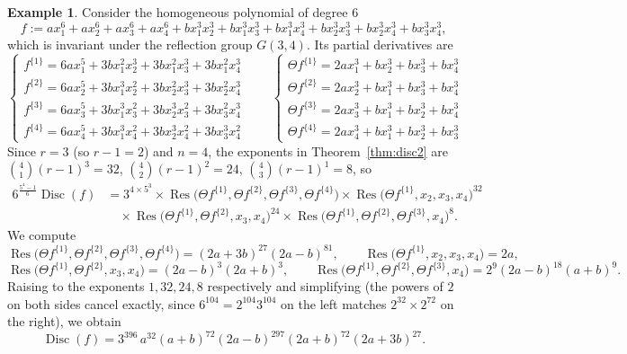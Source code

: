 \documentclass[12pt]{amsart}
\theoremstyle{definition}
\newtheorem{example}[theorem]{Example}
\newcommand{\Res}{\operatorname{Res}}
\newcommand{\Disc}{\operatorname{Disc}}
\begin{document}
\begin{example}
Consider the homogeneous polynomial of degree $6$
\[
f := a x_1^6+ax_2^6+ax_3^6+ax_4^6 + b x_1^3x_2^3+bx_1^3x_3^3+bx_1^3x_4^3+bx_2^3x_3^3+bx_2^3x_4^3+bx_3^3x_4^3,
\]
which is invariant under the reflection group $G(3,4)$. Its partial derivatives are
\[
\begin{cases}
f^{\{1\}} = 6ax_1^5+3bx_1^2x_2^3+3bx_1^2x_3^3+3bx_1^2x_4^3 \\
f^{\{2\}} = 6ax_2^5+3bx_1^3x_2^2+3bx_2^2x_3^3+3bx_2^2x_4^3 \\
f^{\{3\}} = 6ax_3^5+3bx_1^3x_3^2+3bx_2^3x_3^2+3bx_3^2x_4^3 \\
f^{\{4\}} = 6ax_4^5+3bx_1^3x_4^2+3bx_2^3x_4^2+3bx_3^3x_4^2
\end{cases}
\qquad
\begin{cases}
\Theta f^{\{1\}} = 2ax_1^3+bx_2^3+bx_3^3+bx_4^3 \\
\Theta f^{\{2\}} = 2ax_2^3+bx_1^3+bx_3^3+bx_4^3 \\
\Theta f^{\{3\}} = 2ax_3^3+bx_1^3+bx_2^3+bx_4^3 \\
\Theta f^{\{4\}} = 2ax_4^3+bx_1^3+bx_2^3+bx_3^3
\end{cases}
\]
Since $r=3$ (so $r-1=2$) and $n=4$, the exponents in Theorem~\ref{thm:disc2} are $\binom{4}{1}(r-1)^3 = 32$, $\binom{4}{2}(r-1)^2=24$, $\binom{4}{3}(r-1)^1=8$, so
\begin{align*}
6^{\frac{5^4-1}{6}}\Disc(f) &= 3^{4\times 5^3} \times \Res\big(\Theta f^{\{1\}},\Theta f^{\{2\}},\Theta f^{\{3\}},\Theta f^{\{4\}}\big) \times \Res\big(\Theta f^{\{1\}},x_2,x_3,x_4\big)^{32} \\
&\quad \times \Res\big(\Theta f^{\{1\}},\Theta f^{\{2\}},x_3,x_4\big)^{24} \times \Res\big(\Theta f^{\{1\}},\Theta f^{\{2\}},\Theta f^{\{3\}},x_4\big)^{8}.
\end{align*}
We compute
\[
\Res\big(\Theta f^{\{1\}},\Theta f^{\{2\}},\Theta f^{\{3\}},\Theta f^{\{4\}}\big) = (2a+3b)^{27}(2a-b)^{81}, \qquad \Res\big(\Theta f^{\{1\}},x_2,x_3,x_4\big) = 2a,
\]
\[
\Res\big(\Theta f^{\{1\}},\Theta f^{\{2\}},x_3,x_4\big) = (2a-b)^3(2a+b)^3, \qquad \Res\big(\Theta f^{\{1\}},\Theta f^{\{2\}},\Theta f^{\{3\}},x_4\big) = 2^9(2a-b)^{18}(a+b)^9.
\]
Raising to the exponents $1,32,24,8$ respectively and simplifying (the powers of $2$ on both sides cancel exactly, since $6^{104} = 2^{104}3^{104}$ on the left matches $2^{32}\times 2^{72}$ on the right), we obtain
\[
\Disc(f) = 3^{396}\, a^{32}(a+b)^{72}(2a-b)^{297}(2a+b)^{72}(2a+3b)^{27}.
\]
\end{example}
\end{document}
